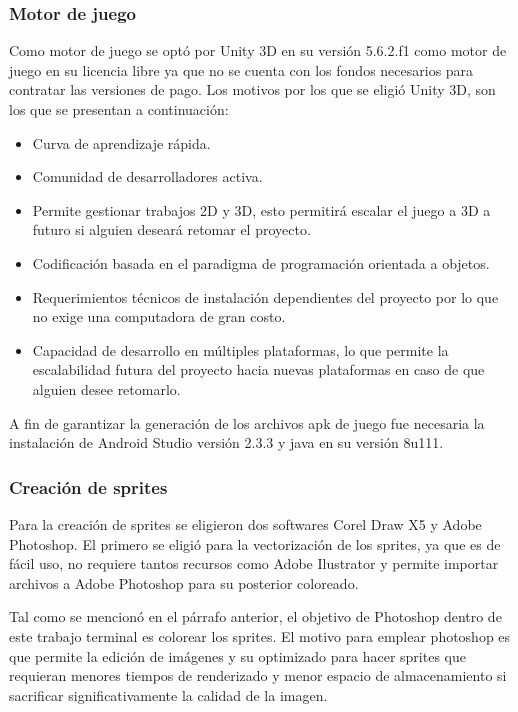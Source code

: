 	\subsubsection{Motor de juego}
Como motor de juego se optó por Unity 3D en su versión 5.6.2.f1 como 
motor de juego en su licencia libre ya que no se cuenta con los fondos necesarios 
para contratar las versiones de pago. Los motivos por los que se eligió Unity 3D,
 son los que se presentan a continuación:
        \begin{itemize}
			\item Curva de aprendizaje rápida.
			\item Comunidad de desarrolladores activa.
			\item Permite gestionar trabajos 2D y 3D, esto permitirá escalar el juego 
                a 3D a futuro si alguien deseará retomar el proyecto.
			\item Codificación basada en el paradigma de programación orientada a
			objetos.
			\item Requerimientos técnicos de instalación dependientes del proyecto por
			lo que no exige una computadora de gran costo.
			\item Capacidad de desarrollo en múltiples plataformas, lo que permite la
                 escalabilidad futura del proyecto hacia nuevas plataformas en caso de
                 que alguien desee retomarlo.
        \end{itemize} 
A fin de garantizar la generación de los archivos apk de juego fue necesaria la instalación de Android Studio versión 2.3.3 y java en su versión  8u111.
	\subsubsection{Creación de sprites}
Para la creación de sprites se eligieron dos softwares Corel Draw X5 y Adobe Photoshop. El primero se eligió para la vectorización de los sprites, ya que es de fácil uso, no requiere tantos recursos como Adobe Ilustrator y permite importar archivos a Adobe Photoshop para su posterior coloreado.
\\
\par
Tal como se mencionó en el párrafo anterior, el objetivo de Photoshop dentro de
 este trabajo terminal es colorear los sprites. El motivo para emplear photoshop
 es que permite la edición de imágenes y su optimizado para hacer sprites que 
 requieran menores tiempos de renderizado y menor espacio de almacenamiento si
 sacrificar significativamente la calidad de la imagen.
